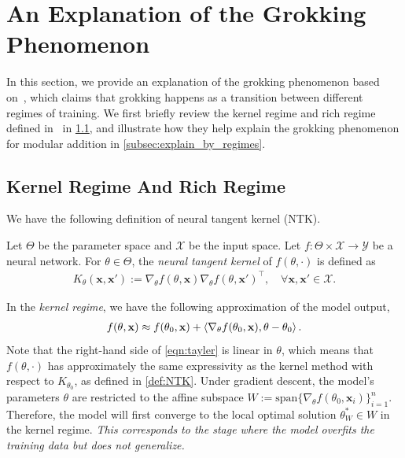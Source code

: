 \section{An Explanation of the Grokking Phenomenon}
\label{sec:explanation}

In this section, we provide an explanation of the grokking phenomenon based on~\cite{KumarBGP24}, which claims that grokking happens as a transition between different regimes of training.
We first briefly review the kernel regime and rich regime defined in~\cite{KumarBGP24} in \cref{subsec:regimes}, and illustrate how they help explain the grokking phenomenon for modular addition in \cref{subsec:explain_by_regimes}.

\subsection{Kernel Regime And Rich Regime}
\label{subsec:regimes}

We have the following definition of neural tangent kernel (NTK).

\begin{definition}
    \label{def:NTK}
    Let $\Theta$ be the parameter space and $\mathcal{X}$ be the input space.
    Let $f \colon \Theta \times \mathcal{X} \to \mathcal{Y}$ be a neural network.
    For $\theta \in \Theta$, the \emph{neural tangent kernel} of $f(\theta, \cdot)$ is defined as 
    \begin{align*}
        K_\theta(\mathbf{x}, \mathbf{x}') := \nabla_\theta f(\theta, \mathbf{x}) \nabla_\theta f(\theta, \mathbf{x}')^\top, 
        \quad \forall \mathbf{x}, \mathbf{x}' \in \mathcal{X}.
    \end{align*}
\end{definition}

In the \emph{kernel regime}, we have the following approximation of the model output, 
\begin{align}
    f(\theta, \mathbf{x}) \approx f(\theta_0, \mathbf{x}) + \Braket{\nabla_{\theta} f(\theta_0, \mathbf{x}), \theta - \theta_0}.
    \label{eqn:tayler}
\end{align}
Note that the right-hand side of \eqref{eqn:tayler} is linear in $\theta$, which means that $f(\theta, \cdot)$ has approximately the same expressivity as the kernel method with respect to $K_{\theta_0}$, as defined in \cref{def:NTK}.
Under gradient descent, the model's parameters $\theta$ are restricted to the affine subspace $W := \mathrm{span}\{\nabla_{\theta} f(\theta_0, \mathbf{x}_i)\}_{i=1}^n$.
Therefore, the model will first converge to the local optimal solution $\theta_W^* \in W$ in the kernel regime.
\emph{This corresponds to the stage where the model overfits the training data but does not generalize.}

